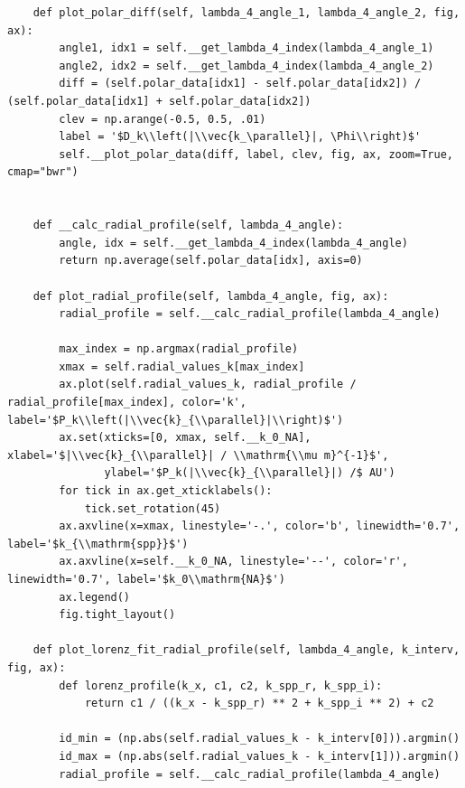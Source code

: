 \documentclass[a4paper, titlepage,  ngerman]{book}
\begin{document}
\begin{verbatim}
    def plot_polar_diff(self, lambda_4_angle_1, lambda_4_angle_2, fig, ax):
        angle1, idx1 = self.__get_lambda_4_index(lambda_4_angle_1)
        angle2, idx2 = self.__get_lambda_4_index(lambda_4_angle_2)
        diff = (self.polar_data[idx1] - self.polar_data[idx2]) / (self.polar_data[idx1] + self.polar_data[idx2])
        clev = np.arange(-0.5, 0.5, .01)
        label = '$D_k\\left(|\\vec{k_\parallel}|, \Phi\\right)$'
        self.__plot_polar_data(diff, label, clev, fig, ax, zoom=True, cmap="bwr")


    def __calc_radial_profile(self, lambda_4_angle):
        angle, idx = self.__get_lambda_4_index(lambda_4_angle)
        return np.average(self.polar_data[idx], axis=0)

    def plot_radial_profile(self, lambda_4_angle, fig, ax):
        radial_profile = self.__calc_radial_profile(lambda_4_angle)

        max_index = np.argmax(radial_profile)
        xmax = self.radial_values_k[max_index]
        ax.plot(self.radial_values_k, radial_profile / radial_profile[max_index], color='k', label='$P_k\\left(|\\vec{k}_{\\parallel}|\\right)$')
        ax.set(xticks=[0, xmax, self.__k_0_NA], xlabel='$|\\vec{k}_{\\parallel}| / \\mathrm{\\mu m}^{-1}$',
               ylabel='$P_k(|\\vec{k}_{\\parallel}|) /$ AU')
        for tick in ax.get_xticklabels():
            tick.set_rotation(45)
        ax.axvline(x=xmax, linestyle='-.', color='b', linewidth='0.7', label='$k_{\\mathrm{spp}}$')
        ax.axvline(x=self.__k_0_NA, linestyle='--', color='r', linewidth='0.7', label='$k_0\\mathrm{NA}$')
        ax.legend()
        fig.tight_layout()

    def plot_lorenz_fit_radial_profile(self, lambda_4_angle, k_interv, fig, ax):
        def lorenz_profile(k_x, c1, c2, k_spp_r, k_spp_i):
            return c1 / ((k_x - k_spp_r) ** 2 + k_spp_i ** 2) + c2

        id_min = (np.abs(self.radial_values_k - k_interv[0])).argmin()
        id_max = (np.abs(self.radial_values_k - k_interv[1])).argmin()
        radial_profile = self.__calc_radial_profile(lambda_4_angle)


\end{verbatim}
\end{document}
